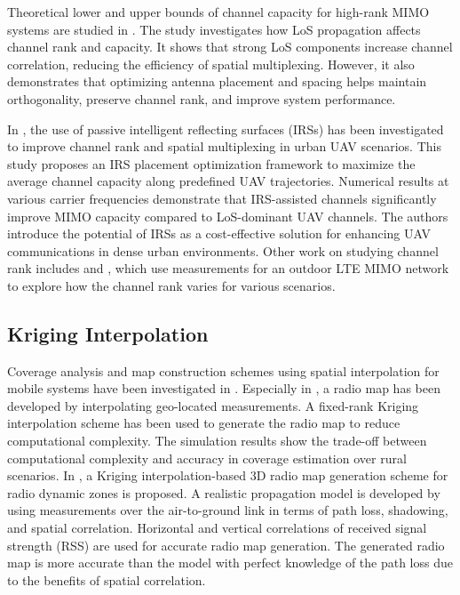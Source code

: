 Theoretical lower and upper bounds of channel capacity for high-rank MIMO systems are studied in \cite{rank_MIMO_bounds}. The study investigates how LoS propagation affects channel rank and capacity. It shows that strong LoS components increase channel correlation, reducing the efficiency of spatial multiplexing. However, it also demonstrates that optimizing antenna placement and spacing helps maintain orthogonality, preserve channel rank, and improve system performance.

In \cite{rank_irs}, the use of passive intelligent reflecting surfaces (IRSs) has been investigated to improve channel rank and spatial multiplexing in urban UAV scenarios. This study proposes an IRS placement optimization framework to maximize the average channel capacity along predefined UAV trajectories. Numerical results at various carrier frequencies demonstrate that IRS-assisted channels significantly improve MIMO capacity compared to LoS-dominant UAV channels. The authors introduce the potential of IRSs as a cost-effective solution for enhancing UAV communications in dense urban environments. Other work on studying channel rank includes \cite{vertical_MIMO_paper} and \cite{vertical_MIMO_paper_2}, which use measurements for an outdoor LTE MIMO network to explore how the channel rank varies for various scenarios. 



\subsection{Kriging Interpolation}
Coverage analysis and map construction schemes using spatial interpolation for mobile systems have been investigated in \cite{Kriging_coverage, fixed_rank_kriging, Kriging_mapping, Kriging_map_construction}. Especially in \cite{Kriging_coverage}, a radio map has been developed by interpolating geo-located measurements. A fixed-rank Kriging interpolation scheme has been used to generate the radio map to reduce computational complexity. The simulation results show the trade-off between computational complexity and accuracy in coverage estimation over rural scenarios. 
In \cite{maeng2023kriging}, a Kriging interpolation-based 3D radio map generation scheme for radio dynamic zones is proposed. A realistic propagation model is developed by using measurements over the air-to-ground link in terms of path loss, shadowing, and spatial correlation. Horizontal and vertical correlations of received signal strength (RSS) are used for accurate radio map generation. The generated radio map is more accurate than the model with perfect knowledge of the path loss due to the benefits of spatial correlation. 

